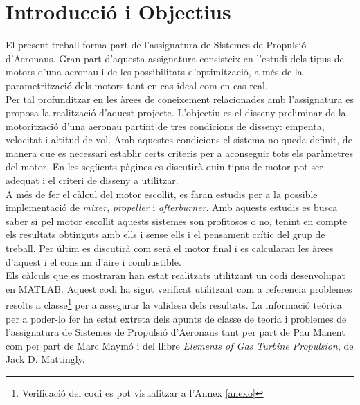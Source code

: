 \section{Introducció i Objectius}
El present treball forma part de l'assignatura de Sistemes de Propulsió d'Aeronaus. Gran part d'aquesta assignatura consisteix en l'estudi dels tipus de motors d'una aeronau i de les possibilitats d'optimització, a més de la parametrització dels motors tant en cas ideal com en cas real.\\
Per tal profunditzar en les àrees de coneixement relacionades amb l'assignatura es proposa la realització d'aquest projecte. L'objectiu es el disseny preliminar de la motorització d'una aeronau partint de tres condicions de disseny: empenta, velocitat i altitud de vol. Amb aquestes condicions el sistema no queda definit, de manera que es necessari establir certs criteris per a aconseguir tots els paràmetres del motor. En les següents pàgines es discutirà quin tipus de motor pot ser adequat i el criteri de disseny a utilitzar.\\
A més de fer el càlcul del motor escollit, es faran estudis per a la possible implementació de \textit{mixer}, \textit{propeller} i \textit{afterburner}. Amb aquests estudis es busca saber si pel motor escollit aquests sistemes son profitosos o no, tenint en compte els resultats obtinguts amb ells i sense ells i el pensament crític del grup de treball. Per últim es discutirà com serà el motor final i es calcularan les àrees d'aquest i el consum d'aire i combustible.\\
Els càlculs que es mostraran han estat realitzats utilitzant un codi desenvolupat en MATLAB. Aquest codi ha sigut verificat utilitzant com a referencia problemes resolts a classe\footnote{Verificació del codi es pot visualitzar a l'Annex \ref{anexo}} per a assegurar la validesa dels resultats. La informació teòrica per a poder-lo fer ha estat extreta dels apunts de classe de teoria i problemes de l'assignatura de Sistemes de Propulsió d'Aeronaus tant per part de Pau Manent com per part de Marc Maymó i del llibre \textit{Elements of Gas Turbine Propulsion}, de Jack D. Mattingly. 